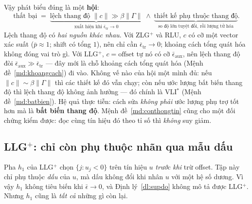 \documentclass[11pt]{article}
\theoremstyle{remark}
\begin{document}
Vậy phát biểu đúng là một \textbf{hội}:
\[
 \text{thất bại}
 \;=\;
 \underbrace{\text{lệch thang độ } \|c\| \gg \beta\|\Gamma\|}_{\text{xuất hiện khi } \bar\epsilon_{\mathrm{tr}}\to0}
 \;\wedge\;
 \underbrace{\text{thiết kế phụ thuộc thang độ}}_{\text{so độ lớn tuyệt đối, rồi lượng tử hóa}} .
\]
Lệch thang độ có \emph{hai nguồn khác nhau}. Với ZLG$^+$ và RLU, $c$ có cỡ
một vector xác suất ($\bar p\approx1$; $\mathrm{shift}$ có tổng $1$), nên chỉ
cần $\bar\epsilon_{\mathrm{tr}}\to0$; khoảng cách tổng quát hóa không đóng
vai trò gì. Với LLG$^+$, $c=\mathrm{offset}$ tự nó có cỡ
$\bar\epsilon_{\mathrm{aux}}$, nên lệch thang độ đòi
$\bar\epsilon_{\mathrm{aux}}\gg\bar\epsilon_{\mathrm{tr}}$ --- đây mới là chỗ
khoảng cách tổng quát hóa (Mệnh đề~\ref{md:khoangcach}) đi vào. Không vế nào
của hội một mình đủ: nếu $\|c\|\sim\beta\|\Gamma\|$ thì các thiết kế đó vẫn
chạy; còn nếu ước lượng bất biến thang độ thì lệch thang độ không ảnh hưởng
--- đó chính là VLI$^*$ (Mệnh đề~\ref{md:batbien}). Hệ quả thực tiễn: cách
sửa \emph{không phải} ước lượng phụ trợ tốt hơn mà là \textbf{bất biến thang
độ}. Mệnh đề~\ref{md:conthongtin} cũng cho một đối chứng kiểm được: đọc cùng
tín hiệu đó theo tỉ số thì \emph{không} suy giảm.

\subsection{LLG\texorpdfstring{$^+$}{+}: chỉ còn phụ thuộc nhãn qua mẫu dấu}
\label{sec:llgp}

Pha $h_1$ của LLG$^+$ chọn $\{j : u_j < 0\}$ trên tín hiệu $u$ \emph{trước
khi} trừ offset. Tập này chỉ phụ thuộc \emph{dấu} của $u$, mà dấu không đổi
khi nhân $u$ với một hệ số dương. Vì vậy $h_1$ không tiêu biến khi
$\bar\epsilon\to0$, và Định lý~\ref{dl:supdo} không mô tả được LLG$^+$. Nhưng
$h_1$ cũng là \emph{tất cả} những gì còn lại.
\end{document}
